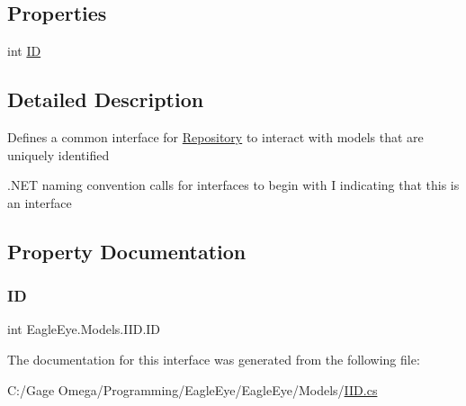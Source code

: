 \subsection*{Properties}
\begin{DoxyCompactItemize}
\item 
int \mbox{\hyperlink{interface_eagle_eye_1_1_models_1_1_i_i_d_a9c97af76fec2f38889ea261ce98ca5f1}{ID}}
\end{DoxyCompactItemize}


\subsection{Detailed Description}
Defines a common interface for \mbox{\hyperlink{class_eagle_eye_1_1_models_1_1_repository}{Repository}} to interact with models that are uniquely identified 

.N\+ET naming convention calls for interfaces to begin with \textquotesingle{}I\textquotesingle{} indicating that this is an interface 

\subsection{Property Documentation}
\mbox{\label{interface_eagle_eye_1_1_models_1_1_i_i_d_a9c97af76fec2f38889ea261ce98ca5f1}} 
\subsubsection{\texorpdfstring{ID}{ID}}
{\footnotesize\ttfamily int Eagle\+Eye.\+Models.\+I\+I\+D.\+ID\hspace{0.3cm}{\ttfamily [get]}}



The documentation for this interface was generated from the following file\+:\begin{DoxyCompactItemize}
\item 
C\+:/\+Gage Omega/\+Programming/\+Eagle\+Eye/\+Eagle\+Eye/\+Models/\mbox{\hyperlink{_i_i_d_8cs}{I\+I\+D.\+cs}}\end{DoxyCompactItemize}
